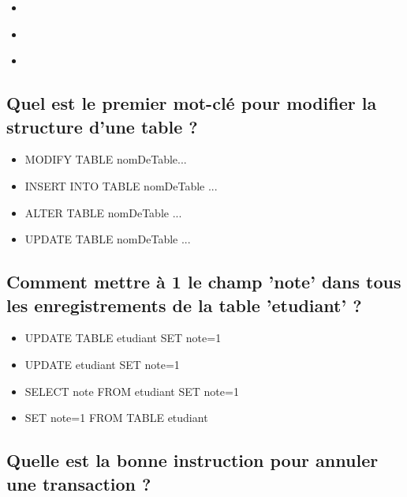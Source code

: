 \documentclass[11pt,a4paper]{article}
\begin{document}
\begin{itemize}
\item[\CaseCoche]  \\
\item[\CaseCoche]  \\
\item[\CaseCoche]  \\  %
\end{itemize}


\subsection{Quel est le premier mot-clé pour modifier la structure d'une table ?}

\begin{itemize}
\item[\CaseCoche] MODIFY TABLE nomDeTable... \\
\item[\CaseCoche] INSERT INTO TABLE nomDeTable ... \\
\item[\CaseCoche] ALTER TABLE nomDeTable ... \\  %
\item[\CaseCoche] UPDATE TABLE nomDeTable ... \\
\end{itemize}


\subsection{Comment mettre à 1 le champ 'note' dans tous les enregistrements de la table 'etudiant' ?}

\begin{itemize}
\item[\CaseCoche] UPDATE TABLE etudiant SET note=1 \\
\item[\CaseCoche] UPDATE etudiant SET note=1 \\  %
\item[\CaseCoche] SELECT note FROM etudiant SET note=1 \\
\item[\CaseCoche] SET note=1 FROM TABLE etudiant \\
\end{itemize}


\subsection{Quelle est la bonne instruction pour annuler une transaction ?}
\end{document}
